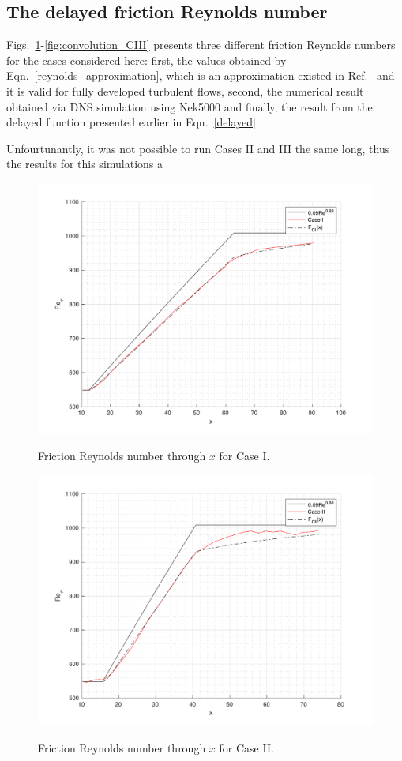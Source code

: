 \documentclass[twocolumn,10pt]{asme2e}
\begin{document}
\subsection*{The delayed friction Reynolds number}

Figs.~\ref{fig:convolution_CI}-\ref{fig:convolution_CIII} presents three different friction Reynolds numbers for the cases considered here: first, the values obtained by Eqn.~\ref{reynolds_approximation}, which is an approximation existed in Ref.~\cite{pope} and it is valid for fully developed turbulent flows, second, the numerical result obtained via DNS simulation using Nek5000 and finally, the result from the delayed function presented earlier in Eqn.~\ref{delayed}

Unfourtunantly, it was not possible to run Cases II and III the same long, thus the results for this simulations a

\begin{figure}[t]
\centering
\scalebox{0.5}
{\includegraphics{convolution_CI.pdf}}
\caption{Friction Reynolds number through \(x\) for Case I.}
\label{fig:convolution_CI}
\end{figure}

\begin{figure}[t]
\centering
\scalebox{0.5}
{\includegraphics{convolution_CII.pdf}}
\caption{Friction Reynolds number through \(x\) for Case II.}
\label{fig:convolution_CII}
\end{figure}
\end{document}
